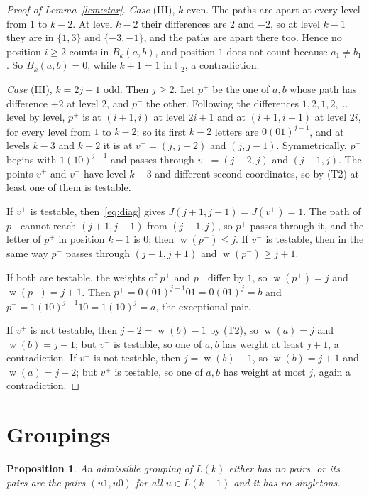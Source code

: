 \documentclass[screen]{aomart}
\newtheorem{proposition}[theorem]{Proposition}
\theoremstyle{definition}
\theoremstyle{remark}
\numberwithin{equation}{section}
\newcommand{\F}{\mathbb{F}}
\DeclareMathOperator{\wt}{w}
\begin{document}
\begin{proof}[Proof of Lemma~\ref{lem:star}]
\emph{Case} (III), $k$ even. The paths are apart at every level from $1$ to $k-2$. At level $k-2$ their differences are $2$ and $-2$, so at level $k-1$ they are in $\{1,3\}$ and $\{-3,-1\}$, and the paths are apart there too. Hence no position $i\ge2$ counts in $B_k(a,b)$, and position $1$ does not count because $a_1\ne b_1$. So $B_k(a,b)=0$, while $k+1=1$ in $\F_2$, a contradiction.

\emph{Case} (III), $k=2j+1$ odd. Then $j\ge2$. Let $p^+$ be the one of $a,b$ whose path has difference $+2$ at level $2$, and $p^-$ the other. Following the differences $1,2,1,2,\dots$ level by level, $p^+$ is at $(i+1,i)$ at level $2i+1$ and at $(i+1,i-1)$ at level $2i$, for every level from $1$ to $k-2$; so its first $k-2$ letters are $0(01)^{j-1}$, and at levels $k-3$ and $k-2$ it is at $v^+=(j,j-2)$ and $(j,j-1)$. Symmetrically, $p^-$ begins with $1(10)^{j-1}$ and passes through $v^-=(j-2,j)$ and $(j-1,j)$. The points $v^+$ and $v^-$ have level $k-3$ and different second coordinates, so by (T2) at least one of them is testable.

If $v^+$ is testable, then~\eqref{eq:diag} gives $J(j+1,j-1)=J(v^+)=1$. The path of $p^-$ cannot reach $(j+1,j-1)$ from $(j-1,j)$, so $p^+$ passes through it, and the letter of $p^+$ in position $k-1$ is $0$; then $\wt(p^+)\le j$. If $v^-$ is testable, then in the same way $p^-$ passes through $(j-1,j+1)$ and $\wt(p^-)\ge j+1$.

If both are testable, the weights of $p^+$ and $p^-$ differ by $1$, so $\wt(p^+)=j$ and $\wt(p^-)=j+1$. Then $p^+=0(01)^{j-1}01=0(01)^j=b$ and $p^-=1(10)^{j-1}10=1(10)^j=a$, the exceptional pair.

If $v^+$ is not testable, then $j-2=\wt(b)-1$ by (T2), so $\wt(a)=j$ and $\wt(b)=j-1$; but $v^-$ is testable, so one of $a,b$ has weight at least $j+1$, a contradiction. If $v^-$ is not testable, then $j=\wt(b)-1$, so $\wt(b)=j+1$ and $\wt(a)=j+2$; but $v^+$ is testable, so one of $a,b$ has weight at most $j$, again a contradiction.
\end{proof}

\section{Groupings}\label{sec:groupings}

\begin{proposition}\label{prop:groupings}
An admissible grouping of $L(k)$ either has no pairs, or its pairs are the pairs $(u1,u0)$ for all $u\in L(k-1)$ and it has no singletons.
\end{proposition}
\end{document}
